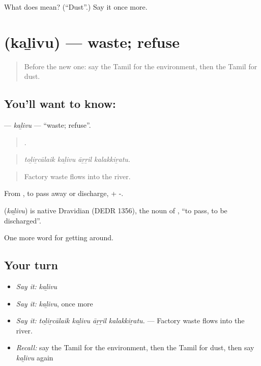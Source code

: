 \begin{tcolorbox}[breakable,colback=teal!4,colframe=teal!35!black,title={Before you move on}]
What does  mean? (\textquotedblleft{}Dust\textquotedblright{}.) Say it once more.
\end{tcolorbox}
\section[\texorpdfstring{\ta{கழிவு} (kaḻivu)}{கழிவு (kaḻivu)}]{ (kaḻivu) — waste; refuse}

\label{lesson:TA-C440-kalivu}



\begin{quote}
Before the new one: say the Tamil for the environment, then the Tamil for dust.
\end{quote}

\subsection*{You'll want to know: }
\textbf{} — \emph{kaḻivu} — \textquotedblleft{}waste; refuse\textquotedblright{}.

\begin{quote}
   .
\end{quote}

\begin{quote}
\emph{toḻiṟcālaik kaḻivu āṟṟil kalakkiṟatu.}
\end{quote}

\begin{quote}
Factory waste flows into the river.
\end{quote}

From , to pass away or discharge, + -.

\begin{cousinweb}
\textbf{} (\emph{kaḻivu}) is native Dravidian (DEDR 1356), the noun of , \textquotedblleft{}to pass, to be discharged\textquotedblright{}.
\end{cousinweb}

\begin{grammarlens}[title={What you've built}]
One more word for getting around.
\end{grammarlens}

\subsection*{Your turn}
\begin{itemize}
\raggedright
  \item \emph{Say it:} \emph{kaḻivu}
  \item \emph{Say it:} \emph{kaḻivu}, once more
  \item \emph{Say it:} \emph{toḻiṟcālaik kaḻivu āṟṟil kalakkiṟatu.} — Factory waste flows into the river.
  \item \emph{Recall:} say the Tamil for the environment, then the Tamil for dust, then say \emph{kaḻivu} again
\end{itemize}

